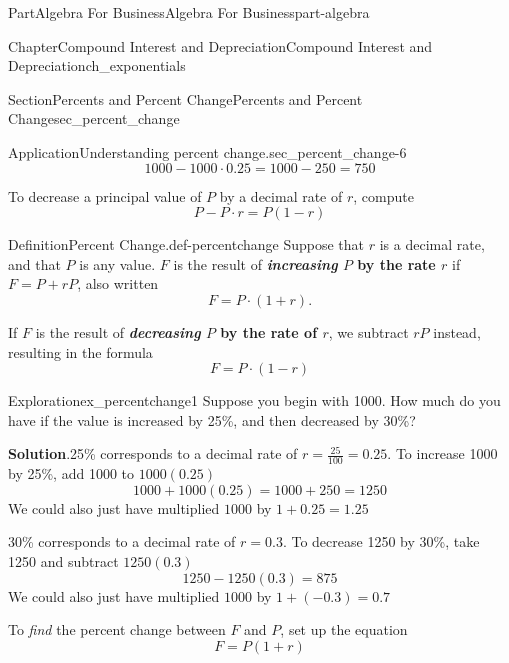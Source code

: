 \documentclass[oneside,10pt,]{tufte-book}
\newcommand{\blocktitlefont}{\relax}
\newcommand{\terminology}[1]{\textbf{#1}}
\numberwithin{equation}{chapter}
\begin{document}
\begin{partptx}{Part}{Algebra For Business}{}{Algebra For Business}{}{}{part-algebra}
\begin{chapterptx}{Chapter}{Compound Interest and Depreciation}{}{Compound Interest and Depreciation}{}{}{ch_exponentials}
\begin{sectionptx}{Section}{Percents and Percent Change}{}{Percents and Percent Change}{}{}{sec_percent_change}
\begin{insight}{Application}{Understanding percent change.}{sec_percent_change-6}
\begin{equation*}
1000 - 1000\cdot 0.25 = 1000 - 250 = 750
\end{equation*}
%
\par
To decrease a principal value of \(P\) by a decimal rate of \(r\), compute%
\begin{equation*}
P - P\cdot r = P(1-r)
\end{equation*}
%
\end{insight}
\begin{definition}{Definition}{Percent Change.}{def-percentchange}%
Suppose that \(r\) is a decimal rate, and that \(P\) is any value. \(F\) is the result of \terminology{\emph{increasing} \(P\) by the rate \(r\)} if \(F = P+rP\), also written%
\begin{equation*}
F = P\cdot (1+r)\text{.}
\end{equation*}
%
\par
If \(F\) is the result of \terminology{\emph{decreasing} \(P\) by the rate of \(r\)}, we subtract \(rP\) instead, resulting in the formula%
\begin{equation*}
F = P\cdot (1-r) 
\end{equation*}
%
\end{definition}
\begin{exploration}{Exploration}{}{ex_percentchange1}%
Suppose you begin with \textdollar{}1000.  How much do you have if the value is increased by 25\%, and then decreased by 30\%?%
\par\smallskip%
\noindent\textbf{\blocktitlefont Solution}.\hypertarget{ex_percentchange1-2}{}\quad{}25\% corresponds to a decimal rate of \(r=\frac{25}{100} = 0.25\). To increase \textdollar{}1000 by 25\%, add \textdollar{}1000 to \(1000(0.25)\)%
\begin{equation*}
1000 + 1000(0.25) = 1000 + 250 = 1250
\end{equation*}
We could also just have multiplied \(1000\) by \(1+0.25 = 1.25\)%
\par
30\% corresponds to a decimal rate of \(r = 0.3\).  To decrease \textdollar{}1250 by 30\%, take \textdollar{}1250 and subtract \(1250(0.3)\)%
\begin{equation*}
1250 - 1250(0.3)=875
\end{equation*}
We could also just have multiplied \(1000\) by \(1  + (-0.3) = 0.7\)%
\end{exploration}%
To \emph{find} the percent change between \(F\) and \(P\), set up the equation%
\begin{equation*}
F = P(1+r)

\end{equation*}
\end{sectionptx}
\end{chapterptx}
\end{partptx}
\end{document}
